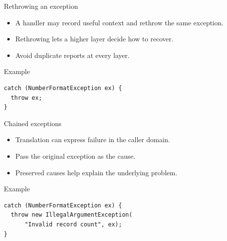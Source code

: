 \documentclass[10pt,aspectratio=169]{beamer}
\begin{document}
\begin{frame}[fragile,t]{Rethrowing an exception}
\begin{itemize}
\item A handler may record useful context and rethrow the same exception.
\item Rethrowing lets a higher layer decide how to recover.
\item Avoid duplicate reports at every layer.
\end{itemize}
\vspace{1mm}\begin{block}{Example}
\begin{lstlisting}
catch (NumberFormatException ex) {
  throw ex;
}
\end{lstlisting}
\end{block}
\end{frame}

\begin{frame}[fragile,t]{Chained exceptions}
\begin{itemize}
\item Translation can express failure in the caller domain.
\item Pass the original exception as the cause.
\item Preserved causes help explain the underlying problem.
\end{itemize}
\vspace{1mm}\begin{block}{Example}
\begin{lstlisting}
catch (NumberFormatException ex) {
  throw new IllegalArgumentException(
      "Invalid record count", ex);
}
\end{lstlisting}
\end{block}
\end{frame}
\end{document}
